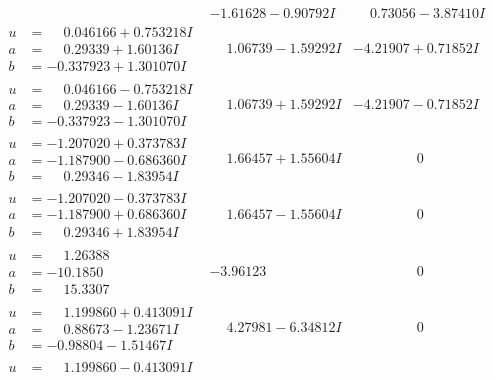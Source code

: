 \documentclass[1p]{elsarticle_modified}
\theoremstyle{definition}
\begin{document}
$$\begin{array}{c|c|c}
 & -1.61628 - 0.90792 I & \phantom{-}0.73056 - 3.87410 I \\ \hline\begin{aligned}
u &= \phantom{-}0.046166 + 0.753218 I \\
a &= \phantom{-}0.29339 + 1.60136 I \\
b &= -0.337923 + 1.301070 I\end{aligned}
 & \phantom{-}1.06739 - 1.59292 I & -4.21907 + 0.71852 I \\ \hline\begin{aligned}
u &= \phantom{-}0.046166 - 0.753218 I \\
a &= \phantom{-}0.29339 - 1.60136 I \\
b &= -0.337923 - 1.301070 I\end{aligned}
 & \phantom{-}1.06739 + 1.59292 I & -4.21907 - 0.71852 I \\ \hline\begin{aligned}
u &= -1.207020 + 0.373783 I \\
a &= -1.187900 - 0.686360 I \\
b &= \phantom{-}0.29346 - 1.83954 I\end{aligned}
 & \phantom{-}1.66457 + 1.55604 I & \phantom{-0.000000 } 0 \\ \hline\begin{aligned}
u &= -1.207020 - 0.373783 I \\
a &= -1.187900 + 0.686360 I \\
b &= \phantom{-}0.29346 + 1.83954 I\end{aligned}
 & \phantom{-}1.66457 - 1.55604 I & \phantom{-0.000000 } 0 \\ \hline\begin{aligned}
u &= \phantom{-}1.26388\phantom{ +0.000000I} \\
a &= -10.1850\phantom{ +0.000000I} \\
b &= \phantom{-}15.3307\phantom{ +0.000000I}\end{aligned}
 & -3.96123\phantom{ +0.000000I} & \phantom{-0.000000 } 0 \\ \hline\begin{aligned}
u &= \phantom{-}1.199860 + 0.413091 I \\
a &= \phantom{-}0.88673 - 1.23671 I \\
b &= -0.98804 - 1.51467 I\end{aligned}
 & \phantom{-}4.27981 - 6.34812 I & \phantom{-0.000000 } 0 \\ \hline\begin{aligned}
u &= \phantom{-}1.199860 - 0.413091 I \\

\end{aligned}
\end{array}$$
\end{document}
